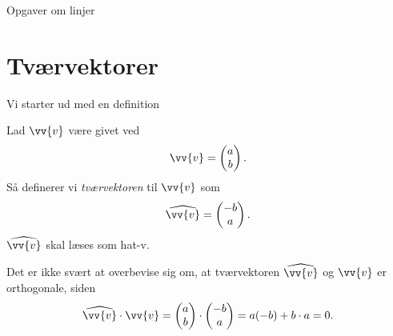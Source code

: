 \begin{center}
\Huge
Opgaver om linjer
\end{center}

\section*{Tværvektorer}

Vi starter ud med en definition
\begin{defn}[Tværvektor]
	Lad $\vv{v}$ være givet ved
	\begin{align*}
		\vv{v} = 
		\begin{pmatrix}
			a\\b
		\end{pmatrix}.	
	\end{align*}
	Så definerer vi \textit{tværvektoren} til $\vv{v}$ som
	\begin{align*}
		\widehat{\vv{v}} = 
		\begin{pmatrix}
			-b \\ a
		\end{pmatrix}.
	\end{align*}
	$\widehat{\vv{v}}$ skal læses som hat-v.
\end{defn}

Det er ikke svært at overbevise sig om, at tværvektoren $ \widehat{\vv{v}}$ og $\vv{v}$ er orthogonale, siden
\begin{align*}
	\widehat{\vv{v}}\cdot \vv{v} = 
	\begin{pmatrix}
		a \\ b
	\end{pmatrix} \cdot 
	\begin{pmatrix}
		-b \\ a
	\end{pmatrix} =
	a(-b) + b\cdot a	 = 0	.
\end{align*}

